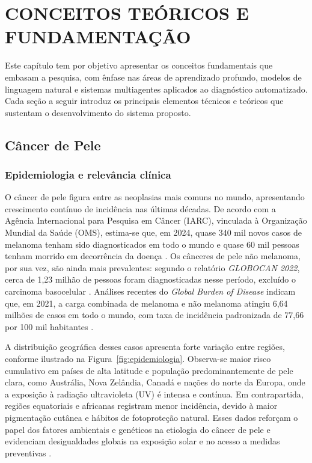 
\chapter{CONCEITOS TEÓRICOS E FUNDAMENTAÇÃO}

Este capítulo tem por objetivo apresentar os conceitos fundamentais que embasam a pesquisa, com ênfase nas áreas de aprendizado profundo, modelos de linguagem natural e sistemas multiagentes aplicados ao diagnóstico automatizado. Cada seção a seguir introduz os principais elementos técnicos e teóricos que sustentam o desenvolvimento do sistema proposto.

\section{Câncer de Pele}
\subsection{Epidemiologia e relevância clínica}

O câncer de pele figura entre as neoplasias mais comuns no mundo, apresentando crescimento contínuo de incidência nas últimas décadas. De acordo com a Agência Internacional para Pesquisa em Câncer (IARC), vinculada à Organização Mundial da Saúde (OMS), estima-se que, em 2024, quase 340 mil novos casos de melanoma tenham sido diagnosticados em todo o mundo e quase 60 mil pessoas tenham morrido em decorrência da doença \cite{iarc2022skincancer}. Os cânceres de pele não melanoma, por sua vez, são ainda mais prevalentes: segundo o relatório \textit{GLOBOCAN 2022}, cerca de 1,23 milhão de pessoas foram diagnosticadas nesse período, excluído o carcinoma basocelular \cite{wang2025global}. Análises recentes do \textit{Global Burden of Disease} indicam que, em 2021, a carga combinada de melanoma e não melanoma atingiu 6,64 milhões de casos em todo o mundo, com taxa de incidência padronizada de 77,66 por 100 mil habitantes \cite{zhou2025global}.

A distribuição geográfica desses casos apresenta forte variação entre regiões, conforme ilustrado na Figura~\ref{fig:epidemiologia}. Observa-se maior risco cumulativo em países de alta latitude e população predominantemente de pele clara, como Austrália, Nova Zelândia, Canadá e nações do norte da Europa, onde a exposição à radiação ultravioleta (UV) é intensa e contínua. Em contrapartida, regiões equatoriais e africanas registram menor incidência, devido à maior pigmentação cutânea e hábitos de fotoproteção natural. Esses dados reforçam o papel dos fatores ambientais e genéticos na etiologia do câncer de pele e evidenciam desigualdades globais na exposição solar e no acesso a medidas preventivas \cite{iarc2022globocan}.

